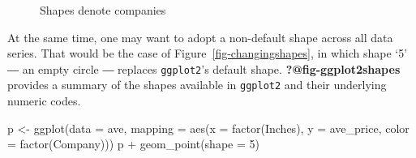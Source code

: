 \documentclass[
  letterpaper,
]{article}
\newenvironment{Shaded}{\begin{snugshade}}{\end{snugshade}}
\newcommand{\AttributeTok}[1]{\textcolor[rgb]{0.40,0.45,0.13}{#1}}
\newcommand{\DecValTok}[1]{\textcolor[rgb]{0.68,0.00,0.00}{#1}}
\newcommand{\FunctionTok}[1]{\textcolor[rgb]{0.28,0.35,0.67}{#1}}
\newcommand{\NormalTok}[1]{\textcolor[rgb]{0.00,0.23,0.31}{#1}}
\newcommand{\OtherTok}[1]{\textcolor[rgb]{0.00,0.23,0.31}{#1}}
\newcommand{\SpecialCharTok}[1]{\textcolor[rgb]{0.37,0.37,0.37}{#1}}
\begin{document}
\begin{figure}[H]


\caption{\label{fig-shapes}Shapes denote companies}

\end{figure}%

At the same time, one may want to adopt a non-default shape across all
data series. That would be the case of Figure~\ref{fig-changingshapes},
in which shape `5' ― an empty circle ― replaces \texttt{ggplot2}'s
default shape. \textbf{?@fig-ggplot2shapes} provides a summary of the
shapes available in \texttt{ggplot2} and their underlying numeric codes.

\begin{Shaded}
\begin{Highlighting}[]
\NormalTok{p }\OtherTok{\textless{}{-}} \FunctionTok{ggplot}\NormalTok{(}\AttributeTok{data =}\NormalTok{ ave, }\AttributeTok{mapping =} \FunctionTok{aes}\NormalTok{(}\AttributeTok{x =} \FunctionTok{factor}\NormalTok{(Inches), }\AttributeTok{y =}\NormalTok{ ave\_price, }\AttributeTok{color =} \FunctionTok{factor}\NormalTok{(Company)))}
\NormalTok{p }\SpecialCharTok{+} \FunctionTok{geom\_point}\NormalTok{(}\AttributeTok{shape =} \DecValTok{5}\NormalTok{)}
\end{Highlighting}
\end{Shaded}
\end{document}
